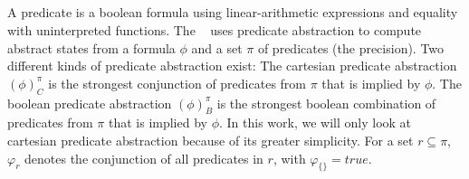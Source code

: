 \subsection{\PredicateCPA}
A predicate is a boolean formula using linear-arithmetic expressions and equality with uninterpreted functions.
The \predicateCPA\ \cite{BeyerBook} \cite{Beyer2008} uses predicate abstraction \cite{Ball2001} to compute abstract states from a formula $\phi$ and a set $\pi$ of predicates (the precision).
Two different kinds of predicate abstraction exist:
The cartesian predicate abstraction $(\phi)^{\pi}_C$ is the strongest conjunction of predicates from $\pi$ that is implied by $\phi$.
The boolean predicate abstraction $(\phi)^{\pi}_B$ is the strongest boolean combination of predicates from $\pi$ that is implied by $\phi$.
In this work, we will only look at cartesian predicate abstraction because of its greater simplicity.
For a set $r \subseteq \pi$, $\varphi_r$ denotes the conjunction of all predicates in $r$, with $\varphi_{\{\}} = true$.

